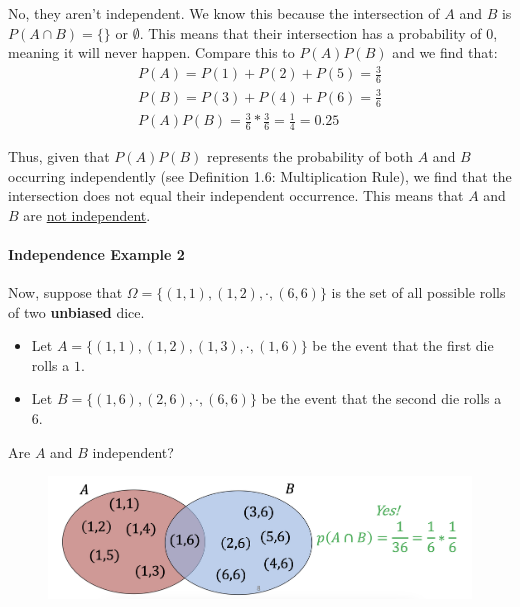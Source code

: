 \documentclass{mlnotes}
\begin{document}
No, they aren't independent. We know this because the intersection of \(A\) and
\(B\) is \(P(A \cap B) = \{\} \text{ or } \emptyset \). This means that their
intersection has a probability of \(0\), meaning it will never happen. Compare this to
\(P(A)P(B)\) and we find that:
\begin{gather*}
P(A) = P(1) + P(2) + P(5) = \frac{3}{6}\\
P(B) = P(3) + P(4) + P(6) = \frac{3}{6}\\
P(A)P(B) = \frac{3}{6} * \frac{3}{6} = \frac{1}{4} = 0.25
\end{gather*}

Thus, given that \(P(A)P(B)\) represents the probability of both \(A\) and \(B\)
occurring independently (see Definition 1.6: Multiplication Rule), we find that
the intersection does not equal their independent occurrence. This means that
\(A\) and \(B\) are \underline{not independent}.

\paragraph{Independence Example 2} Now, suppose that \(\Omega =
\{(1,1),(1,2),\cdot,(6,6)\}\) is the set of all possible rolls of two
\textbf{unbiased} dice.
\begin{itemize}
  \item Let \(A = \{(1,1),(1,2),(1,3),\cdot,(1,6)\}\) be the event that the
  first die rolls a \(1\).
  \item Let \(B = \{(1,6),(2,6),\cdot,(6,6)\}\) be the event that the second die
  rolls a \(6\).
\end{itemize}

Are \(A\) and \(B\) independent?
\begin{figure}[ht]
  \centering
  \includegraphics[width=15cm]{images/image.png}
\end{figure}
\end{document}

